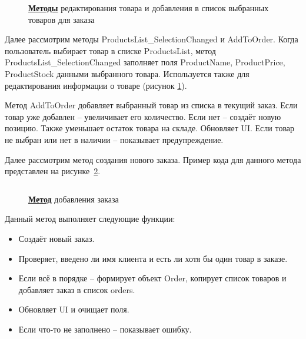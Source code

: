 \documentclass[12pt]{article}
\newcommand{\colorGIT}[1]{\textbf{#1}}
\renewcommand{\texttt}[1]{{\small\ttfamily #1}}
\numberwithin{listing}{section}
\numberwithin{figure}{section}
\begin{document}
\begin{figure}[H]
	\centering
	\inputminted[firstline=143, lastline=184]{csharp}{../../3lab/StoreManager/MainWindow.xaml.cs}
	\caption{\colorGIT{\href{https://github.com/WebMasterIT/Csharp_Labs/blob=ec375afd16c0647b337cf3d8a79c8bef904fc1be/3lab/StoreManager/MainWindow.xaml.cs\#L143-L184}{Методы}} редактирования товара и добавления в список выбранных товаров для заказа}
	\label{fig:MethodEdit}
\end{figure}

Далее рассмотрим методы \texttt{ProductsList\_SelectionChanged} и \texttt{AddToOrder}. Когда пользователь выбирает товар в списке \texttt{ProductsList}, метод \texttt{ProductsList\_SelectionChanged} заполняет поля \texttt{Product\-Name}, \texttt{ProductPrice}, \texttt{ProductStock} данными выбранного товара. Используется также для редактирования информации о товаре (рисунок \ref{fig:MethodEdit}).

Метод \texttt{AddToOrder} добавляет выбранный товар из списка в текущий заказ.
Если товар уже добавлен -- увеличивает его количество.
Если нет -- создаёт новую позицию.
Также уменьшает остаток товара на складе.
Обновляет \texttt{UI}.
Если товар не выбран или нет в наличии -- показывает предупреждение.

{}

Далее рассмотрим метод создания нового заказа. Пример кода для данного метода
представлен на рисунке~\ref{fig:MethodAddInList}.

\begin{figure}[H]
	\centering
	\inputminted[firstline=186, lastline=216]{csharp}{../../3lab/StoreManager/MainWindow.xaml.cs}
	\caption{\colorGIT{\href{https://github.com/WebMasterIT/Csharp_Labs/blob=ec375afd16c0647b337cf3d8a79c8bef904fc1be/3lab/StoreManager/MainWindow.xaml.cs\#L186-L216}{Метод}} добавления заказа}
	\label{fig:MethodAddInList}
\end{figure}

\noindent Данный метод выполняет следующие функции:
\begin{itemize}
	\item Создаёт новый заказ.
	\item Проверяет, введено ли имя клиента и есть ли хотя бы один товар в заказе.
	\item Если всё в порядке -- формирует объект \texttt{Order}, копирует список товаров и добавляет заказ в список \texttt{orders}.
	\item Обновляет \texttt{UI} и очищает поля.
	\item Если что-то не заполнено -- показывает ошибку.
\end{itemize}
\end{document}
